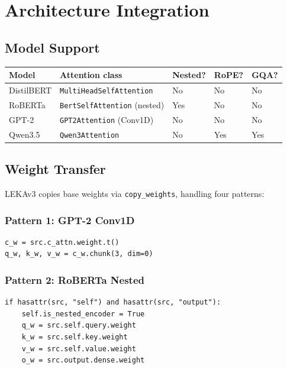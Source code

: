 \section{Architecture Integration}

\subsection{Model Support}

\begin{table}[H]
\centering
\small
\begin{tabular}{lllll}
\toprule
\textbf{Model} & \textbf{Attention class} & \textbf{Nested?} & \textbf{RoPE?} & \textbf{GQA?} \\
\midrule
DistilBERT & \texttt{MultiHeadSelfAttention} & No & No & No \\
RoBERTa & \texttt{BertSelfAttention} (nested) & Yes & No & No \\
GPT-2 & \texttt{GPT2Attention} (Conv1D) & No & No & No \\
Qwen3.5 & \texttt{Qwen3Attention} & No & Yes & Yes \\
\bottomrule
\end{tabular}
\end{table}

\subsection{Weight Transfer}

LEKAv3 copies base weights via \texttt{copy\_weights}, handling four patterns:

\subsubsection{Pattern 1: GPT-2 Conv1D}

\begin{lstlisting}
c_w = src.c_attn.weight.t()
q_w, k_w, v_w = c_w.chunk(3, dim=0)
\end{lstlisting}

\subsubsection{Pattern 2: RoBERTa Nested}

\begin{lstlisting}
if hasattr(src, "self") and hasattr(src, "output"):
    self.is_nested_encoder = True
    q_w = src.self.query.weight
    k_w = src.self.key.weight
    v_w = src.self.value.weight
    o_w = src.output.dense.weight
\end{lstlisting}

